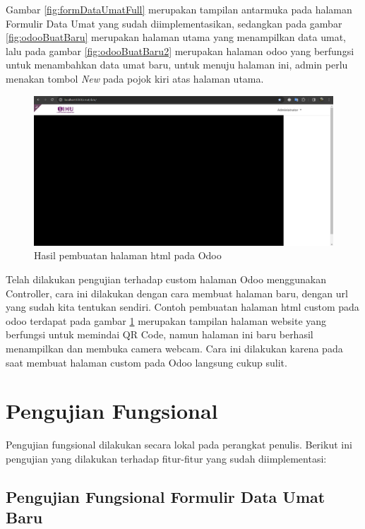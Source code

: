 Gambar \ref{fig:formDataUmatFull} merupakan tampilan antarmuka pada halaman Formulir Data Umat yang sudah diimplementasikan, sedangkan pada gambar \ref{fig:odooBuatBaru} merupakan halaman utama yang menampilkan data umat, lalu pada gambar \ref{fig:odooBuatBaru2} merupakan halaman odoo yang berfungsi untuk menambahkan data umat baru, untuk menuju halaman ini, admin perlu menakan tombol \textit{New} pada pojok kiri atas halaman utama.

\begin{figure}[H]
	\centering
	\includegraphics[scale=0.4]{Gambar/controllerOdoo.png}
	\caption{Hasil pembuatan halaman html pada Odoo} 
	\label{fig:controllerOdoo}
\end{figure}

Telah dilakukan pengujian terhadap custom halaman Odoo menggunakan Controller, cara ini dilakukan dengan cara membuat halaman baru, dengan url yang sudah kita tentukan sendiri. Contoh pembuatan halaman html custom pada odoo terdapat pada gambar \ref{fig:controllerOdoo} merupakan tampilan halaman website yang berfungsi untuk memindai QR Code, namun halaman ini baru berhasil menampilkan dan membuka camera webcam. Cara ini dilakukan karena pada saat membuat halaman custom pada Odoo langsung cukup sulit.

\section{Pengujian Fungsional}
\label{sec:pengujianFungsional}

Pengujian fungsional dilakukan secara lokal pada perangkat penulis. Berikut ini pengujian yang dilakukan terhadap fitur-fitur yang sudah diimplementasi:

\subsection{Pengujian Fungsional Formulir Data Umat Baru}
\label{sec:pengujianFungsionalFormulir}

